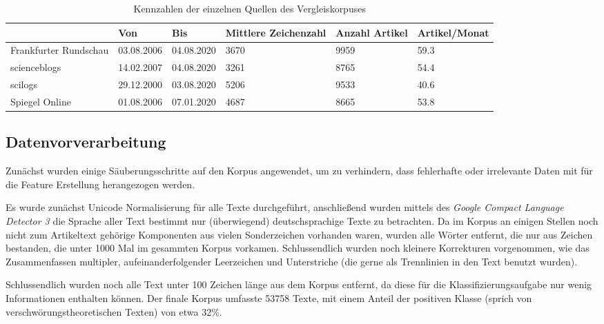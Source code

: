 \begin{table}
    \begin{center}
        \begin{tabularx}{\textwidth}{XXXXXX}
            \toprule
            & Von & Bis & Mittlere Zeichenzahl & Anzahl Artikel & Artikel/Monat\\
            \midrule
            Frankfurter Rundschau & 03.08.2006 & 04.08.2020 & 3670 & 9959 & 59.3\\
            scienceblogs & 14.02.2007 & 04.08.2020 & 3261 & 8765 & 54.4\\
            scilogs & 29.12.2000 & 03.08.2020 & 5206 & 9533 & 40.6\\
            Spiegel Online & 01.08.2006 & 07.01.2020 & 4687 & 8665 & 53.8\\
            \bottomrule
        \end{tabularx}
        \caption{Kennzahlen der einzelnen Quellen des Vergleiskorpuses}
        \label{comcorpus-stats}
    \end{center}
\end{table}

\subsection{Datenvorverarbeitung}

Zunächst wurden einige Säuberungsschritte auf den Korpus angewendet, um zu verhindern, dass fehlerhafte oder irrelevante Daten mit für die Feature Erstellung herangezogen werden.

Es wurde zunächst Unicode Normalisierung für alle Texte durchgeführt, anschließend wurden mittels des \textit{Google Compact Language Detector 3} \parencite[][]{cld3} die Sprache aller Text bestimmt nur (überwiegend) deutschsprachige Texte zu betrachten.
Da im Korpus an einigen Stellen noch nicht zum Artikeltext gehörige Komponenten aus vielen Sonderzeichen vorhanden waren, wurden alle Wörter entfernt, die nur aus Zeichen bestanden, die unter 1000 Mal im gesammten Korpus vorkamen.
Schlussendlich wurden noch kleinere Korrekturen vorgenommen, wie das Zusammenfassen multipler, aufeinanderfolgender Leerzeichen und Unterstriche (die gerne als Trennlinien in den Text benutzt wurden).

Schlussendlich wurden noch alle Text unter 100 Zeichen länge aus dem Korpus entfernt, da diese für die Klassifizierungsaufgabe nur wenig Informationen enthalten können. Der finale Korpus umfasste 53758 Texte, mit einem Anteil der positiven Klasse (sprich von verschwörungstheoretischen Texten) von etwa 32\%.

